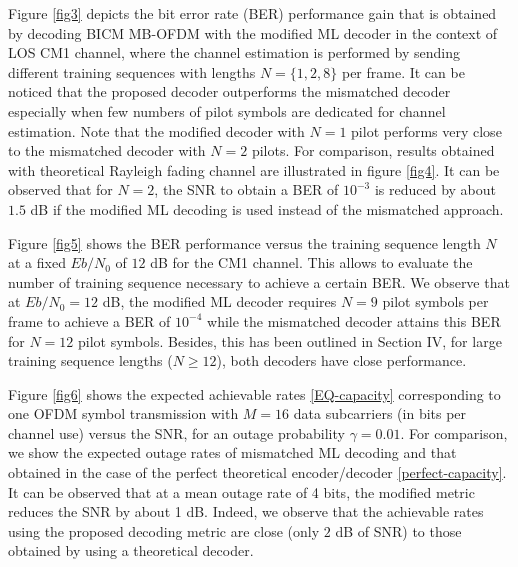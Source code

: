 \documentclass{article}
\begin{document}
Figure \ref{fig3} depicts the bit error rate (BER) performance gain that is obtained by decoding BICM MB-OFDM with the modified ML decoder in the context of LOS CM1 channel, where the channel estimation is performed by sending different training sequences with lengths $N=\{1, 2, 8\}$ per frame. It can be noticed that the proposed decoder outperforms the mismatched decoder especially when few numbers of pilot symbols are dedicated for channel estimation. Note that the modified decoder with $N=1$ pilot performs very close to the mismatched decoder with $N=2$ pilots. 
For comparison, results obtained with theoretical Rayleigh fading channel are illustrated in figure \ref{fig4}. It can be observed that for $N=2$, the SNR to obtain a BER of $10^{-3}$ is reduced by about $1.5$ dB if the modified ML decoding is used instead of the mismatched approach.     

Figure \ref{fig5} shows the BER performance versus the training sequence length $N$ at a fixed $Eb/N_0$ of $12$ dB for the CM1 channel. This allows to evaluate the number of training sequence necessary to achieve a certain BER. We observe that at $Eb/N_0=12$ dB, the modified ML decoder requires $N=9$ pilot symbols per frame to achieve a BER of $10^{-4}$ while the mismatched decoder attains this BER for $N=12$ pilot symbols. Besides, this has been outlined in Section IV, for large training sequence lengths ($N \geq 12$), both decoders have close performance.   

Figure \ref{fig6} shows the expected achievable rates \eqref{EQ-capacity} corresponding to one OFDM symbol transmission with $M=16$ data subcarriers (in bits per channel use) versus the SNR, for an outage probability $\gamma=0.01$. For comparison, we show the expected outage rates of mismatched ML decoding and that obtained in the case of the perfect theoretical encoder/decoder \eqref{perfect-capacity}. It can be observed that at a mean outage rate of 4 bits, the modified metric reduces the SNR by about 1 dB.  Indeed, we observe that the achievable rates using the proposed decoding metric are close (only $2$ dB of SNR) to those obtained by using a theoretical decoder.             
\end{document}
